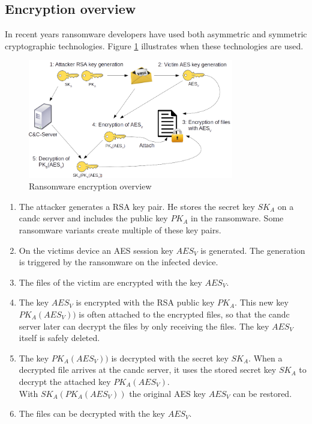 \pagebreak
\subsection{Encryption overview}
\label{subsec:encryption_overview}

In recent years ransomware developers have used both asymmetric and symmetric cryptographic technologies. Figure \ref{fig:encryption_overview} illustrates when these technologies are used.

\begin{figure}[htbp]
  \begin{center}
    \includegraphics[width=0.8\textwidth]{images/encryption_overview.png}
    \caption{Ransomware encryption overview}
    \label{fig:encryption_overview}
  \end{center}
\end{figure}

\begin{enumerate}
\item The attacker generates a RSA key pair. He stores the secret key $SK_A$ on a \gls{candc} server and includes the public key $PK_A$ in the ransomware. Some ransomware variants create multiple of these key pairs.
\item On the victims device an AES session key $AES_V$ is generated. The generation is triggered by the ransomware on the infected device.
\item The files of the victim are encrypted with the key $AES_V$.
\item The key $AES_V$ is encrypted with the RSA public key $PK_A$. This new key $PK_A(AES_V))$ is often attached to the encrypted files, so that the {candc} server later can decrypt the files by only receiving the files. The key $AES_V$ itself is safely deleted.
\item The key $PK_A(AES_V))$ is decrypted with the secret key $SK_A$. When a decrypted file arrives at the \gls{candc} server, it uses the stored secret key $SK_A$ to decrypt the attached key $PK_A(AES_V)$.\\
With $SK_A(PK_A(AES_V))$ the original AES key $AES_V$ can be restored.
\item The files can be decrypted with the key $AES_V$.
\end{enumerate}
